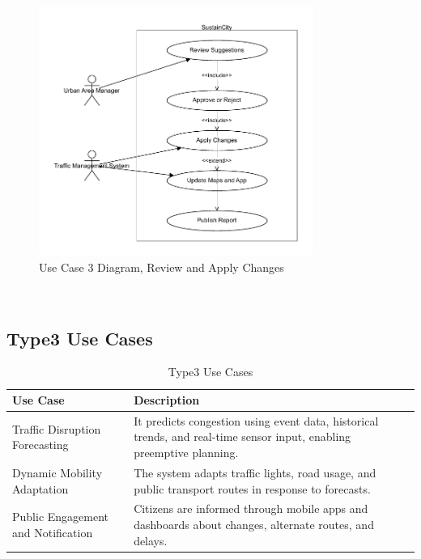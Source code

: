 \documentclass[a4paper,12pt]{article}
\begin{document}
\begin{figure}[h]
    \centering
    \includegraphics[width=0.8\textwidth]{diagrams/Review_and_Apply_Changes.drawio.pdf}
    \caption{Use Case 3 Diagram, Review and Apply Changes}
    \label{fig:Review_and_Apply_Changes.drawio}
\end{figure}
\\

\newpage

\subsection*{Type3 Use Cases}
\begin{table}[h!]
\centering
\begin{tabular}{|p{4.5cm}|p{8.5cm}|}
\hline
\textbf{Use Case} & \textbf{Description} \\
\hline
Traffic Disruption Forecasting & It predicts congestion using event data, historical trends, and real-time sensor input, enabling preemptive planning. \\
\hline
Dynamic Mobility Adaptation & The system adapts traffic lights, road usage, and public transport routes in response to forecasts. \\
\hline
Public Engagement and Notification & Citizens are informed through mobile apps and dashboards about changes, alternate routes, and delays. \\
\hline
\end{tabular}
\caption{Type3 Use Cases}
\end{table}
\end{document}
